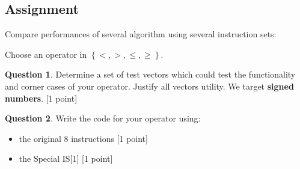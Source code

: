 \documentclass[10pt,a4paper]{article}
\theoremstyle{definition}%
\newtheorem{Q}{Question}[] %
\newcommand{\on}[1]{\operatorname{#1}}
\begin{document}
\newpage
\subsection{Assignment}

Compare performances of several algorithm using several instruction sets:

\noindent Choose an operator in $\left\lbrace <, >, \leq, \geq \right\rbrace$.

\begin{Q}
	Determine a set of test vectors which could test the functionality and corner cases of your operator. Justify all vectors utility. We target \textbf{signed numbers}.	[1 point]
\end{Q}

\begin{Q}
	Write the code for your operator using:
	\begin{itemize}
	\item the original 8 instructions [1 point]
	\item the Special IS[1] [1 point]
	\end{itemize}
\end{Q}
\end{document}
